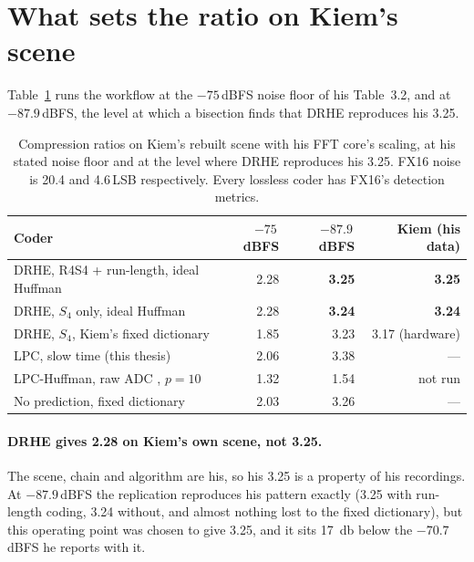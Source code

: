 \section{What sets the ratio on Kiem's scene}
\label{sec:kr_m75}

Table~\ref{tab:kr_m75} runs the workflow at the $-75$\,dBFS noise floor of his
Table~3.2, and at $-87.9$\,dBFS, the level at which a bisection finds that DRHE
reproduces his 3.25.

\begin{table}[htbp]
\centering
\caption[Coders on Kiem's rebuilt scene]{Compression ratios on Kiem's rebuilt
scene with his FFT core's scaling, at his stated noise floor and at the level
where DRHE reproduces his 3.25. FX16 noise is 20.4 and 4.6\,LSB respectively.
Every lossless coder has FX16's detection metrics.}
\label{tab:kr_m75}
\small
\begin{tabular}{@{}lrrr@{}}
\toprule
Coder & $-75$\,dBFS & $-87.9$\,dBFS & Kiem (his data)\\
\midrule
DRHE, R4S4 + run-length, ideal Huffman & 2.28 & \textbf{3.25} & \textbf{3.25}\\
DRHE, $S_4$ only, ideal Huffman & 2.28 & \textbf{3.24} & \textbf{3.24}\\
DRHE, $S_4$, Kiem's fixed dictionary & 1.85 & 3.23 & 3.17 (hardware)\\
LPC, slow time (this thesis) & 2.06 & 3.38 & ---\\
LPC-Huffman, raw ADC \cite{meucci2022}, $p = 10$ & 1.32 & 1.54 & not run\\
No prediction, fixed dictionary & 2.03 & 3.26 & ---\\
\bottomrule
\end{tabular}
\end{table}

\paragraph{DRHE gives 2.28 on Kiem's own scene, not 3.25.} The scene, chain
and algorithm are his, so his 3.25 is a property of his recordings. At
$-87.9$\,dBFS the replication reproduces his pattern exactly (3.25 with
run-length coding, 3.24 without, and almost nothing lost to the fixed
dictionary), but this operating point was chosen to give 3.25, and it sits
\SI{17}{\decibel} below the $-70.7$\,dBFS he reports with it.

